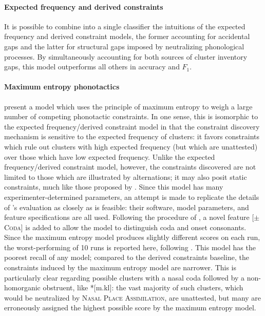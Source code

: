 \paragraph{Expected frequency and derived constraints}
It is possible to combine into a single classifier the intuitions of the expected frequency and derived constraint models, the former accounting for accidental gaps and the latter for structural gaps imposed by neutralizing phonological processes.
By simultaneously accounting for both sources of cluster inventory gaps, this model outperforms all others in accuracy and $F_1$. 

\paragraph{Maximum entropy phonotactics} 
\citet{Hayes2008a} present a model which uses the principle of maximum entropy to weigh a large number of competing phonotactic constraints. 
In one sense, this is isomorphic to the expected frequency/derived constraint model in that the constraint discovery mechanism is sensitive to the expected frequency of clusters: it favors constraints which rule out clusters with high expected frequency (but which are unattested) over those which have low expected frequency.
Unlike the expected frequency/derived constraint model, however, the constraints discovered are not limited to those which are illustrated by alternations; it may also posit static constraints, much like those proposed by \citet{Pierrehumbert1994}.
Since this model has many experimenter-determined parameters, 
an attempt is made to replicate the details of \citeauthor{Hayes2008a}'s evaluation as closely as is feasible: their software, model parameters, and feature specifications are all used. 
Following the procedure of \citet{HayesInPress}, a novel feature [$\pm$\textsc{Coda}] is added to allow the model to distinguish coda and onset consonants. 
Since the maximum entropy model produces slightly different scores on each run, the worst-performing of 10 runs is reported here, following \citet{Hayes2008a}.
This model has the poorest recall of any model; compared to the derived constraints baseline, the constraints induced by the maximum entropy model are narrower.
This is particularly clear regarding possible clusters with a nasal coda followed by a non-homorganic obstruent, like *[m.kl]: the vast majority of such clusters, which would be neutralized by \textsc{Nasal Place Assimilation}, are unattested, but many are erroneously assigned the highest possible score by the maximum entropy model.

